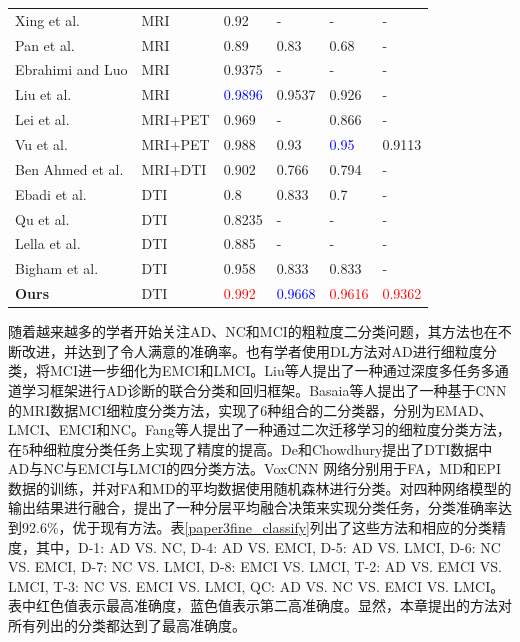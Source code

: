 \begin{table}[ht]
\begin{tabular}{p{3.7cm}<{\centering}|p{1.8cm}<{\centering}|p{1.35cm}<{\centering}|p{1.35cm}<{\centering}|p{1.35cm}<{\centering}|p{1.35cm}<{\centering}}
Xing et al. \cite{xing2020dynamic} & MRI  & 0.92 & -  & - & -    \\
Pan et al. \cite{pan2020early}     & MRI  & 0.89 & 0.83  & 0.68  & -\\
Ebrahimi and Luo \cite{ebrahimi2021convolutional}            & MRI  & 0.9375  & -  & -  & -   \\
Liu et al. \cite{liu2022diagnosis} & MRI & \textcolor{blue}{{0.9896}}  &0.9537 &0.926 & - \\
\hline
Lei et al. \cite{lei2016discriminative}               & MRI+PET   & 0.969& -  & 0.866 & -   \\
Vu et al. \cite{vu2018non}         &  MRI+PET   & 0.988 & 0.93  & \textcolor{blue}{{0.95 }} & 0.9113 \\
Ben Ahmed et al. \cite{ahmed2017recognition}                & MRI+DTI   & 0.902 & 0.766 & 0.794  & - \\
\hline
Ebadi et al. \cite{ebadi2017ensemble}               & DTI & 0.8  & 0.833 & 0.7   & -   \\
Qu et al. \cite{qu2021ai4ad}       & DTI& 0.8235  & - & -  & - \\
Lella et al.  \cite{lella2021ensemble}                    & DTI  & 0.885   & -  & -   & - \\
Bigham et al.  \cite{bigham2022features}                   & DTI & 0.958 & 0.833  & 0.833  & - \\
\textbf{Ours} & DTI
& \textcolor{red}{{0.992}}
& \textcolor{blue}{{0.9668}}
& \textcolor{red}{{0.9616}}
& \textcolor{red}{{0.9362}}                 \\
\hline
\end{tabular}
\end{table}


随着越来越多的学者开始关注AD、NC和MCI的粗粒度二分类问题，其方法也在不断改进，并达到了令人满意的准确率。也有学者使用DL方法对AD进行细粒度分类\cite{ 2020Convolutional}，将MCI进一步细化为EMCI和LMCI。Liu等人\cite{liu2018joint}提出了一种通过深度多任务多通道学习框架进行AD诊断的联合分类和回归框架。Basaia等人\cite{2018Automated}提出了一种基于CNN的MRI数据MCI细粒度分类方法，实现了6种组合的二分类器，分别为EMAD、LMCI、EMCI和NC。Fang等人\cite{Fangmeie2022}提出了一种通过二次迁移学习的细粒度分类方法，在5种细粒度分类任务上实现了精度的提高。De和Chowdhury\cite{de2021dti}提出了DTI数据中AD与NC与EMCI与LMCI的四分类方法。VoxCNN \cite{korolev2017residual}网络分别用于FA，MD和EPI数据的训练，并对FA和MD的平均数据使用随机森林进行分类。对四种网络模型的输出结果进行融合，提出了一种分层平均融合决策来实现分类任务，分类准确率达到92.6\%，优于现有方法。表\ref{paper3fine_classify}列出了这些方法和相应的分类精度，其中，D-1: AD VS. NC, D-4: AD VS. EMCI, D-5: AD VS. LMCI, D-6: NC VS. EMCI, D-7: NC VS. LMCI, D-8: EMCI VS. LMCI, T-2: AD VS. EMCI VS. LMCI, T-3: NC VS. EMCI VS. LMCI, QC: AD VS. NC VS. EMCI VS. LMCI。表中红色值表示最高准确度，蓝色值表示第二高准确度。显然，本章提出的方法对所有列出的分类都达到了最高准确度。

